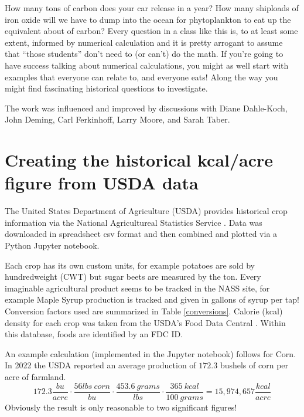 \documentclass[prb,preprint]{revtex4-2}
\newcommand{\be}{\begin{equation}}
\newcommand{\ee}{\end{equation}}
\begin{document}
How many tons of carbon does your car release in a year? How many shiploads of iron oxide will we have to dump into the ocean for phytoplankton to eat up the equivalent about of carbon?  Every question in a class like this is, to at least some extent, informed by numerical calculation and it is pretty arrogant to assume that ``those students'' don't need to (or can't) do the math.  If you're going to have success talking about numerical calculations, you might as well start with examples that everyone can relate to, and everyone eats!  Along the way you might find fascinating historical questions to investigate.   


\begin{acknowledgments}
The work was influenced and improved by discussions with 
Diane Dahle-Koch, 
John Deming, 
Carl Ferkinhoff, 
Larry Moore, 
and Sarah Taber.
\end{acknowledgments}

\clearpage
\appendix
\section{Creating the historical kcal/acre figure from USDA data}
\label{how_yield_plot_is_made}
The United States Department of Agriculture (USDA) provides historical crop information via the National Agricultureal Statistics Service 
\cite{USDA_NASS} .
Data was downloaded in spreadsheet csv format and then combined and plotted via a Python Jupyter notebook.   

Each crop has its own custom units, for example potatoes are sold by hundredweight (CWT) but sugar beets are measured by the ton.  
Every imaginable agricultural product seems to be tracked in the NASS site, for example Maple Syrup production is tracked and given in gallons of syrup per tap! 
Conversion factors used are summarized in Table \ref{conversions}.  
Calorie (kcal) density for each crop was taken from the USDA's Food Data Central
\cite{USDA_FDC}.
Within this database, foods are identified by an FDC ID.  

An example calculation (implemented in the Jupyter notebook) follows for Corn.  
In 2022 the USDA reported an average production of $172.3$ bushels of corn per acre of farmland.  
\be
172.3\frac{bu}{acre}\cdot\frac{56lbs~corn}{bu}\cdot\frac{453.6~grams}{lbs}\cdot\frac{365~kcal}{100~grams} = 15,974,657 \frac{kcal}{acre}
\label{example_calculation}
\ee
Obviously the result is only reasonable to two significant figures!
\end{document}
